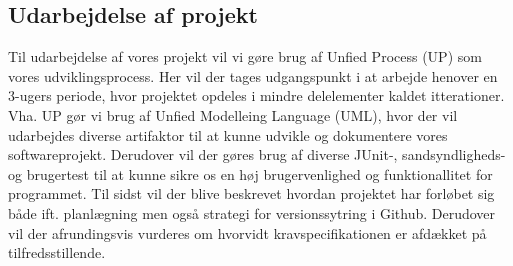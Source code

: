 \documentclass[../main.tex]{subfiles}
\begin{document}
\begin{flushleft}
\subsection{Udarbejdelse af projekt}
Til udarbejdelse af vores projekt vil vi gøre brug af Unfied Process (UP) som vores udviklingsprocess. Her vil der tages udgangspunkt i at arbejde henover en 3-ugers periode, hvor projektet opdeles i mindre delelementer kaldet itterationer. Vha. UP gør vi brug af Unfied Modelleing Language (UML), hvor der vil udarbejdes diverse artifaktor til at kunne udvikle og dokumentere vores softwareprojekt. Derudover vil der gøres brug af diverse JUnit-, sandsyndligheds- og brugertest til at kunne sikre os en høj brugervenlighed og funktionallitet for programmet. Til sidst vil der blive beskrevet hvordan projektet har forløbet sig både ift. planlægning men også strategi for versionssytring i Github. Derudover vil der afrundingsvis vurderes om hvorvidt kravspecifikationen er afdækket på tilfredsstillende.


\end{flushleft}
\end{document}

